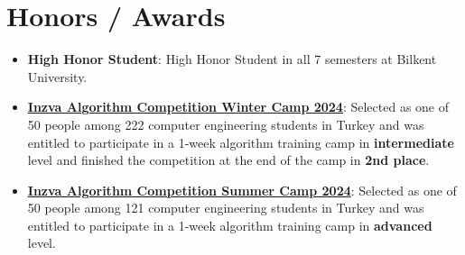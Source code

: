\documentclass[letterpaper,11pt]{article}
\newcommand{\resumeItem}[2]{
  \item\small{
    \textbf{#1}{: #2 \vspace{-2pt}}
  }
}
\newcommand{\resumeSubItem}[2]{\resumeItem{#1}{#2}\vspace{-4pt}}
\newcommand{\resumeSubHeadingListStart}{\begin{itemize}[leftmargin=*]}
\newcommand{\resumeSubHeadingListEnd}{\end{itemize}}
\begin{document}
\section{Honors / Awards}
  \resumeSubHeadingListStart
  \resumeSubItem{High Honor Student}{High Honor Student in all 7 semesters at Bilkent University.}
    \resumeSubItem{\href{https://inzva.com/algorithm/camps/2024/winter/algorithm-competition-winter-camp-2024}{Inzva Algorithm Competition Winter Camp 2024}}
      {Selected as one of 50 people among 222 computer engineering students in Turkey and was entitled to participate in a 1-week algorithm training camp in \textbf{intermediate} level and finished the competition at the end of the camp in \textbf{2nd place}.}
    \resumeSubItem{\href{https://inzva.com/algorithm/camps/2024/summer/algorithm-competition-summer-camp-2024}{Inzva Algorithm Competition Summer Camp 2024}}
      {Selected as one of 50 people among 121 computer engineering students in Turkey and was entitled to participate in a 1-week algorithm training camp in \textbf{advanced} level.}
  \resumeSubHeadingListEnd
\end{document}
